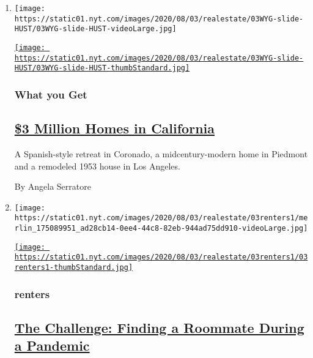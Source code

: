 \begin{enumerate}
\def\labelenumi{\arabic{enumi}.}
\item
  \texttt{[image: https://static01.nyt.com/images/2020/08/03/realestate/03WYG-slide-HUST/03WYG-slide-HUST-videoLarge.jpg]}

  \href{/2020/08/03/realestate/3-million-dollar-homes-for-sale-ca.html}{\texttt{[image: https://static01.nyt.com/images/2020/08/03/realestate/03WYG-slide-HUST/03WYG-slide-HUST-thumbStandard.jpg]}}

  \hypertarget{what-you-get}{%
  \subsubsection{What you Get}\label{what-you-get}}

  \hypertarget{3-million-homes-in-california}{%
  \subsection{\texorpdfstring{\href{/2020/08/03/realestate/3-million-dollar-homes-for-sale-ca.html}{\$3
  Million Homes in
  California}}{\$3 Million Homes in California}}\label{3-million-homes-in-california}}

  A Spanish-style retreat in Coronado, a midcentury-modern home in
  Piedmont and a remodeled 1953 house in Los Angeles.

  By Angela Serratore
\item
  \texttt{[image: https://static01.nyt.com/images/2020/08/03/realestate/03renters1/merlin\_175089951\_ad28cb14-0ee4-44c8-82eb-944ad75dd910-videoLarge.jpg]}

  \href{/2020/08/03/realestate/coronavirus-roommate-renters.html}{\texttt{[image: https://static01.nyt.com/images/2020/08/03/realestate/03renters1/03renters1-thumbStandard.jpg]}}

  \hypertarget{renters}{%
  \subsubsection{renters}\label{renters}}

  \hypertarget{the-challenge-finding-a-roommate-during-a-pandemic}{%
  \subsection{\texorpdfstring{\href{/2020/08/03/realestate/coronavirus-roommate-renters.html}{The
  Challenge: Finding a Roommate During a
  Pandemic}}{The Challenge: Finding a Roommate During a Pandemic}}\label{the-challenge-finding-a-roommate-during-a-pandemic}}


\end{enumerate}

